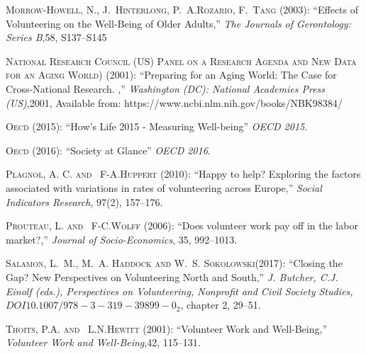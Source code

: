 \documentclass[10pt, letterpaper]{article}
\begin{document}
\begin{spacing}{1.4}
\begin{thebibliography}{87}
\textsc{Morrow-Howell, N., J.~Hinterlong, P.~A.Rozario, F.~Tang} (2003):
  \enquote{Effects of Volunteering on the Well-Being of Older Adults,} \emph{The Journals of Gerontology: Series B},58, S137--S145

\textsc{National Research Council (US) Panel on a Research Agenda and New Data for an Aging World)} (2001):
  \enquote{Preparing for an Aging World: The Case for Cross-National Research. ,} \emph{Washington (DC): National Academies Press (US)},2001, Available from: https://www.ncbi.nlm.nih.gov/books/NBK98384/


\textsc{Oecd} (2015): \enquote{How's Life  2015 - Measuring Well-being} \emph{OECD 2015}.

\textsc{Oecd} (2016): \enquote{Society at Glance} \emph{OECD 2016}.

\textsc{Plagnol, A. C. and ~F-A.Huppert } (2010): \enquote{Happy to help? Exploring the factors associated with variations in rates of volunteering across Europe,} \emph{Social Indicators Research}, 97(2), 157--176.
  
\textsc{Prouteau, L. and ~F-C.Wolff } (2006): \enquote{Does volunteer work pay off in the labor market?,} \emph{Journal of Socio-Economics}, 35, 992--1013.

 \textsc{Salamon, L.~M., M.~A. Haddock and W.~S. Sokolowski}(2017):
 \enquote{Closing the Gap? New Perspectives on Volunteering North and South,} \emph{J. Butcher, C.J. Einolf (eds.), Perspectives on Volunteering, Nonprofit and Civil Society Studies, $DOI 10.1007/978-3-319-39899-0_2$}, chapter 2, 29--51.
  
\textsc{Thoits, P.A. and ~L.N.Hewitt } (2001): \enquote{Volunteer Work and Well-Being,} \emph{Volunteer Work and Well-Being},42, 115--131.



\end{thebibliography}
\end{spacing}
\end{document}
